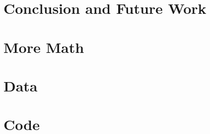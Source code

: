 \documentclass[12pt]{report}
\begin{document}
\chapter{Conclusion and Future Work}
\label{chap:outro}


\appendix

\chapter{More Math}


\chapter{Data}


\chapter{Code}



\printbibliography[heading=bibintoc,title={References}]
\end{document}
